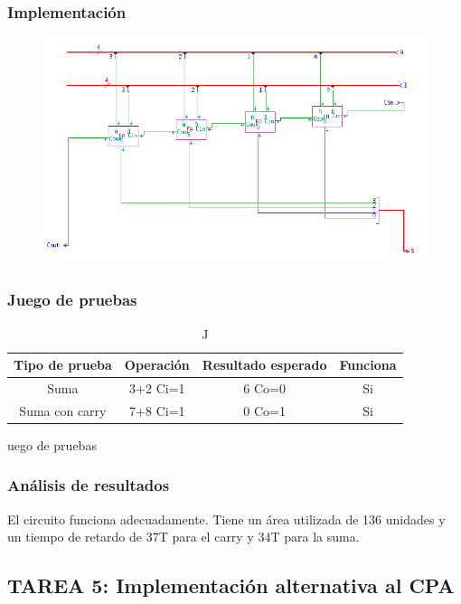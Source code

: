\documentclass{article}
\begin{document}
		\subsubsection*{Implementación}
		 \begin{figure}[ht]
			\includegraphics[width=0.8\linewidth]{CPA}
		 	\centering
		 \end{figure}


		\subsubsection*{Juego de pruebas}
		\begin{table}[h]
			\begin{center}
				\begin{tabular}{| c | c | c | c |}
					\hline
					Tipo de prueba & Operación & Resultado esperado & Funciona \\ \hline
					
					Suma & 3+2 Ci=1 & 6 Co=0 & Si \\ \hline
					Suma con carry & 7+8 Ci=1 & 0 Co=1 & Si \\ \hline
				\end{tabular}
				\caption Juego de pruebas
			\end{center}
		\end{table}



		\subsubsection*{Análisis de resultados}
		El circuito funciona adecuadamente. Tiene un área utilizada de 136 unidades y un tiempo de retardo de 37T para el carry y 34T para la suma.

	\subsection{TAREA 5: Implementación alternativa al CPA}
\end{document}
